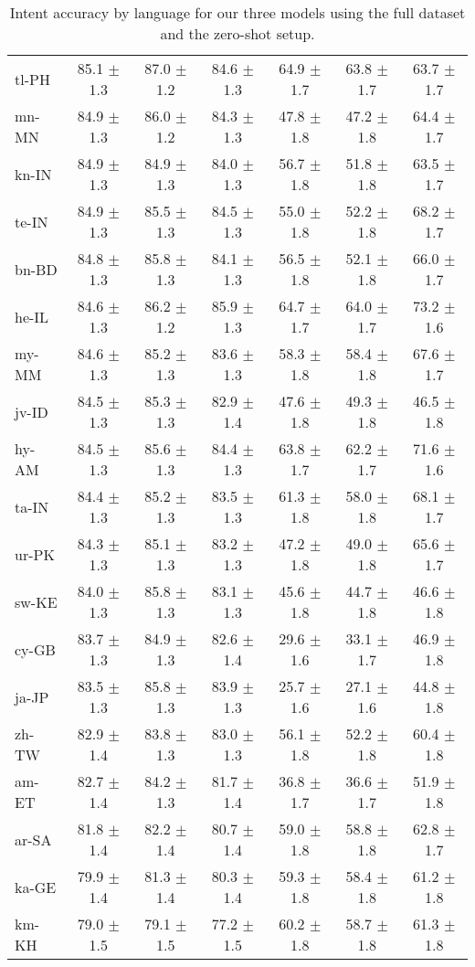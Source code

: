 \documentclass[11pt]{article}
\begin{document}
\begin{table*}[]
{\begin{tabular}{lcccccc}
tl-PH & 85.1 $\pm$ 1.3 & 87.0 $\pm$ 1.2 & 84.6 $\pm$ 1.3 & 64.9 $\pm$ 1.7 & 63.8 $\pm$ 1.7 & 63.7 $\pm$ 1.7 \\
mn-MN & 84.9 $\pm$ 1.3 & 86.0 $\pm$ 1.2 & 84.3 $\pm$ 1.3 & 47.8 $\pm$ 1.8 & 47.2 $\pm$ 1.8 & 64.4 $\pm$ 1.7 \\
kn-IN & 84.9 $\pm$ 1.3 & 84.9 $\pm$ 1.3 & 84.0 $\pm$ 1.3 & 56.7 $\pm$ 1.8 & 51.8 $\pm$ 1.8 & 63.5 $\pm$ 1.7 \\
te-IN & 84.9 $\pm$ 1.3 & 85.5 $\pm$ 1.3 & 84.5 $\pm$ 1.3 & 55.0 $\pm$ 1.8 & 52.2 $\pm$ 1.8 & 68.2 $\pm$ 1.7 \\
bn-BD & 84.8 $\pm$ 1.3 & 85.8 $\pm$ 1.3 & 84.1 $\pm$ 1.3 & 56.5 $\pm$ 1.8 & 52.1 $\pm$ 1.8 & 66.0 $\pm$ 1.7 \\
he-IL & 84.6 $\pm$ 1.3 & 86.2 $\pm$ 1.2 & 85.9 $\pm$ 1.3 & 64.7 $\pm$ 1.7 & 64.0 $\pm$ 1.7 & 73.2 $\pm$ 1.6 \\
my-MM & 84.6 $\pm$ 1.3 & 85.2 $\pm$ 1.3 & 83.6 $\pm$ 1.3 & 58.3 $\pm$ 1.8 & 58.4 $\pm$ 1.8 & 67.6 $\pm$ 1.7 \\
jv-ID & 84.5 $\pm$ 1.3 & 85.3 $\pm$ 1.3 & 82.9 $\pm$ 1.4 & 47.6 $\pm$ 1.8 & 49.3 $\pm$ 1.8 & 46.5 $\pm$ 1.8 \\
hy-AM & 84.5 $\pm$ 1.3 & 85.6 $\pm$ 1.3 & 84.4 $\pm$ 1.3 & 63.8 $\pm$ 1.7 & 62.2 $\pm$ 1.7 & 71.6 $\pm$ 1.6 \\
ta-IN & 84.4 $\pm$ 1.3 & 85.2 $\pm$ 1.3 & 83.5 $\pm$ 1.3 & 61.3 $\pm$ 1.8 & 58.0 $\pm$ 1.8 & 68.1 $\pm$ 1.7 \\
ur-PK & 84.3 $\pm$ 1.3 & 85.1 $\pm$ 1.3 & 83.2 $\pm$ 1.3 & 47.2 $\pm$ 1.8 & 49.0 $\pm$ 1.8 & 65.6 $\pm$ 1.7 \\
sw-KE & 84.0 $\pm$ 1.3 & 85.8 $\pm$ 1.3 & 83.1 $\pm$ 1.3 & 45.6 $\pm$ 1.8 & 44.7 $\pm$ 1.8 & 46.6 $\pm$ 1.8 \\
cy-GB & 83.7 $\pm$ 1.3 & 84.9 $\pm$ 1.3 & 82.6 $\pm$ 1.4 & 29.6 $\pm$ 1.6 & 33.1 $\pm$ 1.7 & 46.9 $\pm$ 1.8 \\
ja-JP & 83.5 $\pm$ 1.3 & 85.8 $\pm$ 1.3 & 83.9 $\pm$ 1.3 & 25.7 $\pm$ 1.6 & 27.1 $\pm$ 1.6 & 44.8 $\pm$ 1.8 \\
zh-TW & 82.9 $\pm$ 1.4 & 83.8 $\pm$ 1.3 & 83.0 $\pm$ 1.3 & 56.1 $\pm$ 1.8 & 52.2 $\pm$ 1.8 & 60.4 $\pm$ 1.8 \\
am-ET & 82.7 $\pm$ 1.4 & 84.2 $\pm$ 1.3 & 81.7 $\pm$ 1.4 & 36.8 $\pm$ 1.7 & 36.6 $\pm$ 1.7 & 51.9 $\pm$ 1.8 \\
ar-SA & 81.8 $\pm$ 1.4 & 82.2 $\pm$ 1.4 & 80.7 $\pm$ 1.4 & 59.0 $\pm$ 1.8 & 58.8 $\pm$ 1.8 & 62.8 $\pm$ 1.7 \\
ka-GE & 79.9 $\pm$ 1.4 & 81.3 $\pm$ 1.4 & 80.3 $\pm$ 1.4 & 59.3 $\pm$ 1.8 & 58.4 $\pm$ 1.8 & 61.2 $\pm$ 1.8 \\
km-KH & 79.0 $\pm$ 1.5 & 79.1 $\pm$ 1.5 & 77.2 $\pm$ 1.5 & 60.2 $\pm$ 1.8 & 58.7 $\pm$ 1.8 & 61.3 $\pm$ 1.8 \\

\bottomrule
\end{tabular}
}
\caption{Intent accuracy by language for our three models using the full dataset and the zero-shot setup.}
\label{tab:all_intent_acc}
\end{table*}
\end{document}
